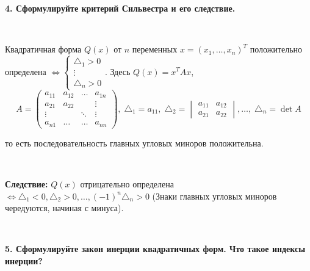 \documentclass{article}
\begin{document}
    \textbf{4. Сформулируйте критерий Сильвестра и его следствие.}

    {
        $\;$
        \setlength{\parindent}{0.4cm}
        \hangindent=0.4cm

    Квадратичная форма $Q(x)$ от $n$ переменных $x=(x_1, \ldots, x_n)^T$ положительно определена $\Leftrightarrow\begin{cases}
                                                                                                                     \triangle_1>0\\
                                                                                                                     \vdots\\
                                                                                                                     \triangle_n>0
    \end{cases}$. Здесь $Q(x)=x^TAx$, $$A=\begin{pmatrix}
                                              a_{11} & a_{12} & \ldots & a_{1n} \\
                                              a_{21} & a_{22} &        & \vdots \\
                                              \vdots &        & \ddots & \vdots \\
                                              a_{n1} & \ldots & \ldots & a_{nn}
    \end{pmatrix},    \;\triangle_1=a_{11},\; \triangle_2=\begin{vmatrix}
                                                              a_{11} & a_{12} \\
                                                              a_{21} & a_{22}
    \end{vmatrix}, \ldots,\; \triangle_n=\det A$$

        то есть последовательность главных угловых миноров положительна.

        $\;$

        \textbf{Следствие:} $Q(x)$ отрицательно определена $\Leftrightarrow\triangle_1<0, \triangle_2>0, \ldots, (-1)^n\triangle_n>0$ (Знаки главных угловых миноров чередуются, начиная с минуса).

        $\;$
        \setlength{\parindent}{0cm}
        \hangindent=0cm
    }

    \textbf{5. Сформулируйте закон инерции квадратичных форм. Что такое индексы инерции?}
\end{document}
